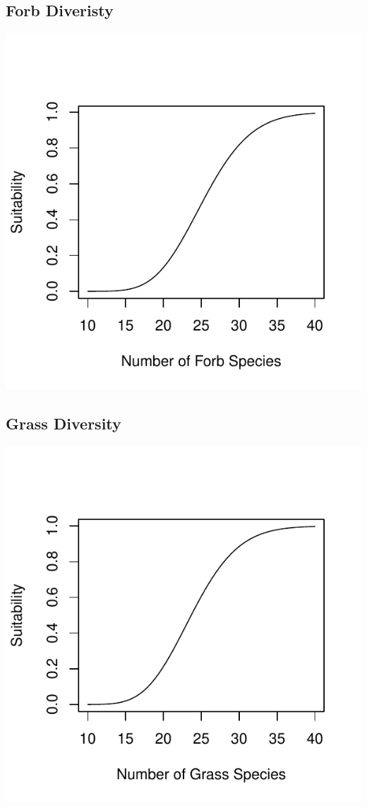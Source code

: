 \documentclass[12pt,letterpaper]{article}\usepackage{graphicx, color}
\makeatletter
\def\maxwidth{ %
  \ifdim\Gin@nat@width>\linewidth
    \linewidth
  \else
    \Gin@nat@width
  \fi
}
\newenvironment{knitrout}{}{} %
\makeatother
\begin{document}
\subsection{Forb Diveristy}
\begin{knitrout}
\color{fgcolor}\includegraphics[width=\maxwidth]{figure/Roy_FD} 
\end{knitrout}

\subsection{Grass Diversity}
\begin{knitrout}
\color{fgcolor}\includegraphics[width=\maxwidth]{figure/Grass_Diversity_Roy} 
\end{knitrout}
\end{document}

